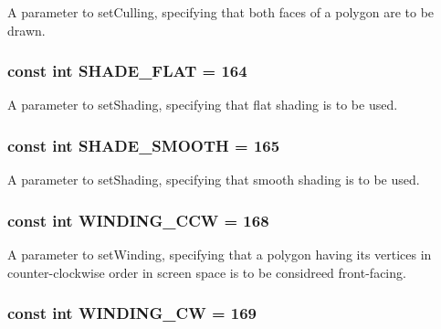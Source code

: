 A parameter to setCulling, specifying that both faces of a polygon are to be drawn. \hypertarget{classm3g_1_1PolygonMode_5da32249eba3f6eb4366f016c424099e}{
\subsubsection[{SHADE\_\-FLAT}]{\setlength{\rightskip}{0pt plus 5cm}const int {\bf SHADE\_\-FLAT} = 164}}
\label{classm3g_1_1PolygonMode_5da32249eba3f6eb4366f016c424099e}


A parameter to setShading, specifying that flat shading is to be used. \hypertarget{classm3g_1_1PolygonMode_2da5e6696c8e910d9fca74b583a081df}{
\subsubsection[{SHADE\_\-SMOOTH}]{\setlength{\rightskip}{0pt plus 5cm}const int {\bf SHADE\_\-SMOOTH} = 165}}
\label{classm3g_1_1PolygonMode_2da5e6696c8e910d9fca74b583a081df}


A parameter to setShading, specifying that smooth shading is to be used. \hypertarget{classm3g_1_1PolygonMode_98d881cf813edf483860268535014210}{
\subsubsection[{WINDING\_\-CCW}]{\setlength{\rightskip}{0pt plus 5cm}const int {\bf WINDING\_\-CCW} = 168}}
\label{classm3g_1_1PolygonMode_98d881cf813edf483860268535014210}


A parameter to setWinding, specifying that a polygon having its vertices in counter-clockwise order in screen space is to be considreed front-facing. \hypertarget{classm3g_1_1PolygonMode_86975b3dec0d6cc20f54fd82eb13ef9e}{
\subsubsection[{WINDING\_\-CW}]{\setlength{\rightskip}{0pt plus 5cm}const int {\bf WINDING\_\-CW} = 169}}
\label{classm3g_1_1PolygonMode_86975b3dec0d6cc20f54fd82eb13ef9e}


